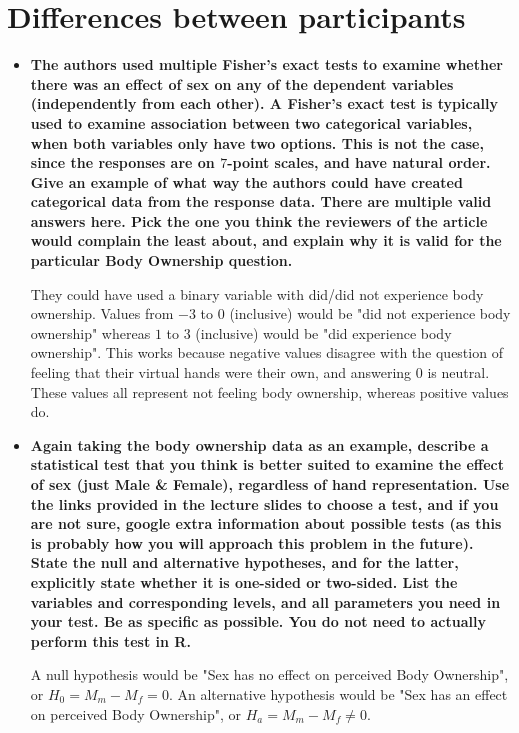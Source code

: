 \section{Differences between participants}

\begin{itemize}
\item {
    \textbf{
        The authors used multiple Fisher's exact tests to examine whether
        there was an effect of sex on any of the dependent variables (independently from each other). A Fisher's exact test is typically
        used to examine association between two categorical variables,
        when both variables only have two options. This is not the case,
        since the responses are on $7$-point scales, and have natural order.
        Give an example of what way the authors could have created categorical data from the response data. There are multiple valid
        answers here. Pick the one you think the reviewers of the article
        would complain the least about, and explain why it is valid for the
        particular Body Ownership question.
    }

    They could have used a binary variable with did/did not experience body ownership.
    Values from $-3$ to $0$ (inclusive) would be "did not experience body ownership" whereas $1$ to $3$ (inclusive) would be "did experience body ownership". This works because negative values disagree with the question of feeling that their virtual hands were their own, and answering $0$ is neutral. These values all represent not feeling body ownership, whereas positive values do.
}

\item {
    \textbf{
        Again taking the body ownership data as an example, describe a
        statistical test that you think is better suited to examine the effect
        of sex (just Male \& Female), regardless of hand representation.
        Use the links provided in the lecture slides to choose a test, and
        if you are not sure, google extra information about possible tests
        (as this is probably how you will approach this problem in the
        future). State the null and alternative hypotheses, and for the
        latter, explicitly state whether it is one-sided or two-sided. List the
        variables and corresponding levels, and all parameters you need
        in your test. Be as specific as possible. You do not need to actually
        perform this test in R.
    }

    A null hypothesis would be "Sex has no effect on perceived Body Ownership", or $H_0 = M_m - M_f = 0$. An alternative hypothesis would be "Sex has an effect on perceived Body Ownership", or $H_a = M_m - M_f \neq 0$.

}
\end{itemize}
